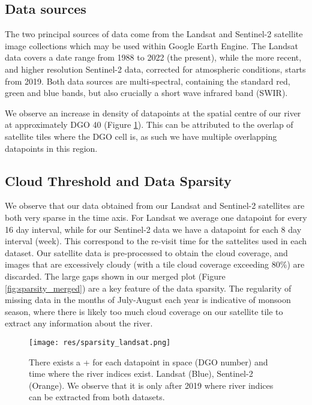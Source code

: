\documentclass[12pt]{article}
\begin{document}
\subsection{Data sources}
The two principal sources of data come from the Landsat\cite{landsat} and Sentinel-2\cite{sentinel} satellite image collections which may be used within Google Earth Engine. The Landsat data covers a date range from 1988 to 2022 (the present), while the more recent, and higher resolution Sentinel-2 data, corrected for atmospheric conditions, starts from 2019. Both data sources are multi-spectral, containing the standard red, green and blue bands, but also crucially a short wave infrared band (SWIR). 

We observe an increase in density of datapoints at the spatial centre of our river at approximately DGO 40 (Figure \ref{fig:sparsity_landsat}). This can be attributed to the overlap of satellite tiles where the DGO cell is, as such we have multiple overlapping datapoints in this region.


\subsection{Cloud Threshold and Data Sparsity}
We observe that our data obtained from our Landsat and Sentinel-2 satellites are both very sparse in the time axis. For Landsat we average one datapoint for every 16 day interval, while for our Sentinel-2 data we have a datapoint for each 8 day interval (week). This correspond to the re-visit time for the sattelites used in each dataset. Our satellite data is pre-processed to obtain the cloud coverage, and images that are excessively cloudy (with a tile cloud coverage exceeding 80\%) are discarded. The large gaps shown in our merged plot (Figure \ref{fig:sparsity_merged}) are a key feature of the data sparsity. The regularity of missing data in the months of July-August each year is indicative of monsoon season, where there is likely too much cloud coverage on our satellite tile to extract any information about the river. 
\begin{figure}[H]
    \centering
    \texttt{[image: res/sparsity\_landsat.png]}
    \caption{There exists a {+} for each datapoint in space (DGO number) and time where the river indices exist. Landsat (Blue), Sentinel-2 (Orange). We observe that it is only after 2019 where river indices can be extracted from both datasets.}
    \label{fig:sparsity_landsat}
\end{figure}
\end{document}
